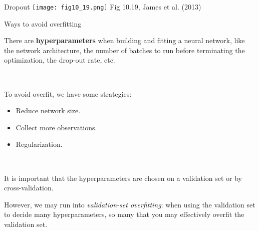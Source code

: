 \documentclass[
  10pt,
  ignorenonframetext,
  twocolumn]{beamer}
\begin{document}
\begin{frame}
\begin{block}{Dropout}
\label{dropout-1}
\texttt{[image: fig10\_19.png]} \scriptsize Fig 10.19, James et al.
(2013)
\end{block}
\end{frame}

\begin{frame}
\begin{block}{Ways to avoid overfitting}
\label{ways-to-avoid-overfitting}
\(~\)

There are \textbf{hyperparameters} when building and fitting a neural
network, like the network architecture, the number of batches to run
before terminating the optimization, the drop-out rate, etc.

\(~\)

To avoid overfit, we have some strategies:

\vspace{2mm}

\begin{itemize}
\item
  Reduce network size. \vspace{2mm}
\item
  Collect more observations. \vspace{2mm}
\item
  Regularization.
\end{itemize}

\(~\)

It is important that the hyperparameters are chosen on a validation set
or by cross-validation.

\vspace{2mm}

However, we may run into \emph{validation-set overfitting}: when using
the validation set to decide many hyperparameters, so many that you may
effectively overfit the validation set.
\end{block}
\end{frame}
\end{document}
